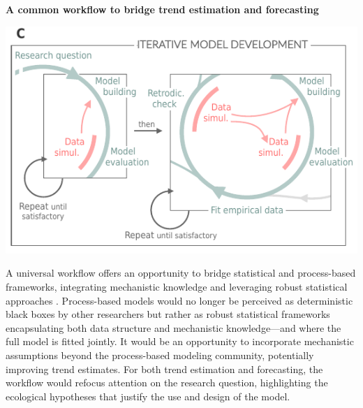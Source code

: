 \documentclass[11pt]{article}
\begin{document}
\begin{tcolorbox}
{\begin{multicols}{2}
\vfill

\end{multicols}}

\centerline{\bf A common workflow to bridge trend estimation and forecasting} 
\vspace*{-3mm}
{\begin{multicols}{2}
\begin{minipage}[t]{\linewidth}
	\vfill
\includegraphics[width=\linewidth]{../../figures/iterativeworkflow_details_revised}
\vfill
\vspace*{3mm}
\end{minipage}

\columnbreak
\vspace*{1mm}
A universal workflow offers an opportunity to bridge statistical and process-based frameworks, integrating mechanistic knowledge and leveraging robust statistical approaches \citep[e.g.][]{rounce2020quantifying}. Process-based models would no longer be perceived as deterministic black boxes by other researchers but rather as robust statistical frameworks encapsulating both data structure and mechanistic knowledge---and where the full model is fitted jointly. It would be an opportunity to incorporate mechanistic assumptions beyond the process-based modeling community, potentially improving trend estimates. For both trend estimation and forecasting, the workflow would refocus attention on the research question, highlighting the ecological hypotheses that justify the use and design of the model.

\end{multicols}}

\end{tcolorbox}
\end{document}
